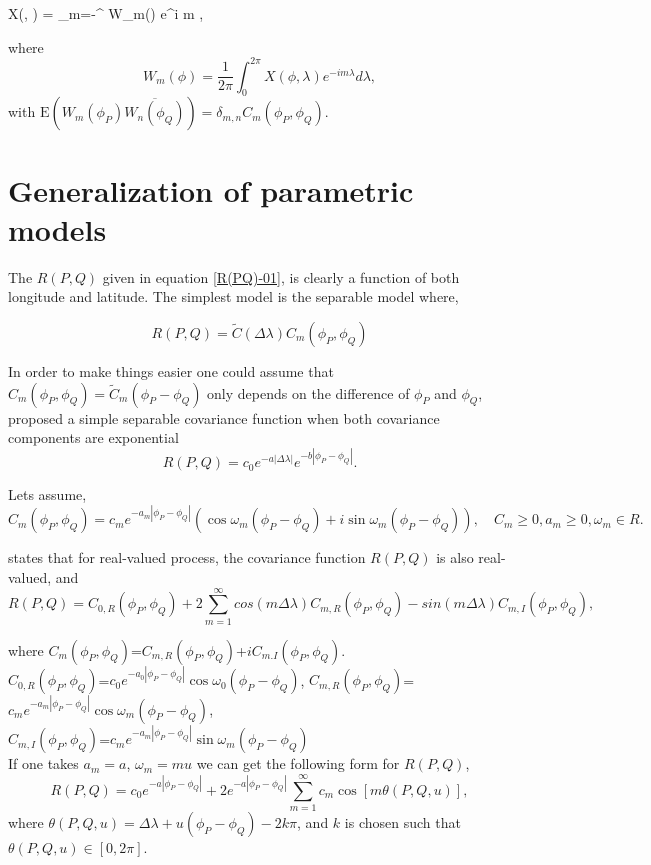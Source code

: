 	\beq
	\label{eq:sym_process} X(\phi, \lambda) = \sum_{m=-\infty}^{\infty} W_m(\phi) e^{i m \lambda}
	\eeq,
	
	where
	\[
		W_m(\phi) = \frac{1}{2\pi} \int_0^{2\pi} X(\phi, \lambda) e^{-i m \lambda} d \lambda,
	\]
	with $\mbox{E}(W_m(\phi_P) \overline{W_n(\phi_Q)}) = \delta_{m,n} C_m(\phi_P, \phi_Q)$. \\
	
	\section{Generalization of parametric models}
	
	The $R(P,Q)$ given in equation \ref{R(PQ)-01}, is clearly a function of both longitude and latitude. The simplest model is the separable model where,
	
	\[
		R(P,Q) = \tilde{C}(\Delta\lambda)C_m(\phi_P,\phi_Q)
	\]
	
	In order to make things easier one could assume that $C_m(\phi_P, \phi_Q) = \tilde{C}_m(\phi_P - \phi_Q)$ only depends on the difference of $\phi_P$ and $\phi_Q$, \cite{HuangZhangRobeson2011} proposed a simple separable covariance function when both covariance components are exponential
	\[
		R(P, Q) = c_0e^{-a|\Delta \lambda|}e^{-b|\phi_P - \phi_Q|}.
	\]
	
	Lets assume,
	\[
		C_m(\phi_P,\phi_Q)=c_m e^{-a_m|\phi_P-\phi_Q|}(\cos\omega_m(\phi_P-\phi_Q)+i\sin\omega_m(\phi_P-\phi_Q)), \quad C_m \ge 0,a_m\ge0,\omega_m\in R.
	\]
	
	
	\cite[Remark 2.4]{Huang2012}states that for real-valued process, the covariance function $R(P,Q)$ is also real-valued, and
	\[
		R(P,Q)=C_{0,R}(\phi_P,\phi_Q)+2 \sum_{m=1}^{\infty}cos(m\Delta\lambda)C_{m,R}(\phi_P,\phi_Q)-sin(m\Delta\lambda)C_{m,I}(\phi_P,\phi_Q),
	\]
	
	where $C_m(\phi_P,\phi_Q)$=$C_{m,R}(\phi_P,\phi_Q)$+$iC_{m.I}(\phi_P,\phi_Q)$.\\
	$C_{0,R}(\phi_P,\phi_Q)$=$c_0e^{-a_0|\phi_P-\phi_Q|}\cos\omega_0(\phi_P-\phi_Q)$, $C_{m,R}(\phi_P,\phi_Q)$=$c_me^{-a_m|\phi_P-\phi_Q|}\cos\omega_m(\phi_P-\phi_Q)$,\\
	$C_{m,I}(\phi_P,\phi_Q)$=$c_me^{-a_m|\phi_P-\phi_Q|}\sin\omega_m(\phi_P-\phi_Q)$\\
	
	If one takes $a_m=a$, $\omega_m=mu$ we can get the following form for $R(P,Q)$,
	\[
		R(P,Q)=c_0e^{-a|\phi_P-\phi_Q|}+2e^{-a|\phi_P-\phi_Q|} \sum_{m=1}^{\infty}c_m\cos[m\theta(P,Q,u)],
	\]
	where $\theta(P,Q,u)=\Delta\lambda+u(\phi_P-\phi_Q)-2k\pi$, and $k$ is chosen such that $\theta(P,Q,u)\in[0,2\pi]$.\\
	
